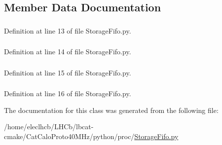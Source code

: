 \subsection{Member Data Documentation}
\hypertarget{classStorageFifo_1_1StorageFifo_ab27e4a7f4056b6e6b6c7b323d95eae6b}{
\subsubsection[{s1}]{}}
\label{classStorageFifo_1_1StorageFifo_ab27e4a7f4056b6e6b6c7b323d95eae6b}


Definition at line 13 of file StorageFifo.py.\hypertarget{classStorageFifo_1_1StorageFifo_a652e937ce967ee77a0ab1179b0eb39d1}{
\subsubsection[{s2}]{}}
\label{classStorageFifo_1_1StorageFifo_a652e937ce967ee77a0ab1179b0eb39d1}


Definition at line 14 of file StorageFifo.py.\hypertarget{classStorageFifo_1_1StorageFifo_afe12db64baa102770551ba2a1e8cf1e7}{
\subsubsection[{s3}]{}}
\label{classStorageFifo_1_1StorageFifo_afe12db64baa102770551ba2a1e8cf1e7}


Definition at line 15 of file StorageFifo.py.\hypertarget{classStorageFifo_1_1StorageFifo_a55e9317951aa785bd4404dfe90e9a74a}{
\subsubsection[{s4}]{}}
\label{classStorageFifo_1_1StorageFifo_a55e9317951aa785bd4404dfe90e9a74a}


Definition at line 16 of file StorageFifo.py.

The documentation for this class was generated from the following file:\begin{DoxyCompactItemize}
\item 
/home/eleclhcb/LHCb/lbcat-\/cmake/CatCaloProto40MHz/python/proc/\hyperlink{StorageFifo_8py}{StorageFifo.py}\end{DoxyCompactItemize}
